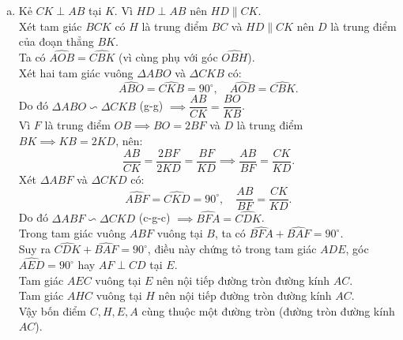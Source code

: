 \begin{bt}
{\begin{enumerate}[a)]
	Độ dài đoạn thẳng $OH$ là:
	$$OH = OI - IH = R - r.$$
	Vì $SC = 2 \cdot OH$ nên:
	$$CS = 2(R - r).$$
	\item Kẻ $CK \perp AB$ tại $K$. Vì $HD \perp AB$ nên $HD \parallel CK$.\\
	Xét tam giác $BCK$ có $H$ là trung điểm $BC$ và $HD \parallel CK$ nên $D$ là trung điểm của đoạn thẳng $BK$.\\
	Ta có $\widehat{AOB} = \widehat{CBK}$ (vì cùng phụ với góc $\widehat{OBH}$).\\
	Xét hai tam giác vuông $\Delta ABO$ và $\Delta CKB$ có:
	$$\widehat{ABO} = \widehat{CKB} = 90^\circ, \quad \widehat{AOB} = \widehat{CBK}.$$
	Do đó $\Delta ABO \backsim \Delta CKB$ (g-g) $\implies \dfrac{AB}{CK} = \dfrac{BO}{KB}$.\\
	Vì $F$ là trung điểm $OB \implies BO = 2BF$ và $D$ là trung điểm $BK \implies KB = 2KD$, nên:
	$$\dfrac{AB}{CK} = \dfrac{2BF}{2KD} = \dfrac{BF}{KD} \implies \dfrac{AB}{BF} = \dfrac{CK}{KD}.$$
	Xét $\Delta ABF$ và $\Delta CKD$ có:
	$$\widehat{ABF} = \widehat{CKD} = 90^\circ, \quad \dfrac{AB}{BF} = \dfrac{CK}{KD}.$$
	Do đó $\Delta ABF \backsim \Delta CKD$ (c-g-c) $\implies \widehat{BFA} = \widehat{CDK}$.\\
	Trong tam giác vuông $ABF$ vuông tại $B$, ta có $\widehat{BFA} + \widehat{BAF} = 90^\circ$.\\
	Suy ra $\widehat{CDK} + \widehat{BAF} = 90^\circ$, điều này chứng tỏ trong tam giác $ADE$, góc $\widehat{AED} = 90^\circ$ hay $AF \perp CD$ tại $E$.\\
	Tam giác $AEC$ vuông tại $E$ nên nội tiếp đường tròn đường kính $AC$.\\
	Tam giác $AHC$ vuông tại $H$ nên nội tiếp đường tròn đường kính $AC$.\\
	Vậy bốn điểm $C, H, E, A$ cùng thuộc một đường tròn (đường tròn đường kính $AC$).
\end{enumerate}
}
\end{bt}



